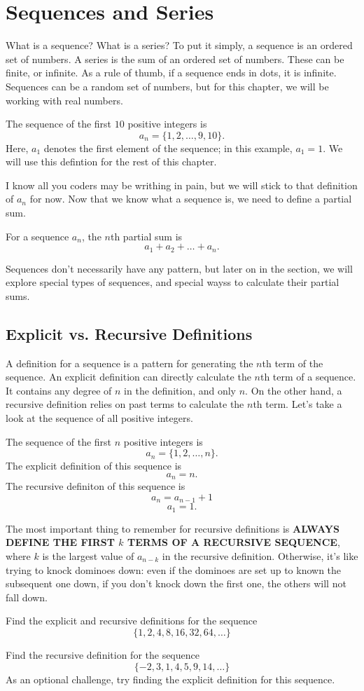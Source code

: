 \chapter{Sequences and Series}
What is a sequence? What is a series? To put it simply, a sequence is an ordered set of numbers. A series is the sum of an ordered set of numbers. These can be finite, or infinite. As a rule of thumb, if a sequence ends in dots, it is infinite. Sequences can be a random set of numbers, but for this chapter, we will be working with real numbers.
\begin{example}
    The sequence of the first $10$ positive integers is
    \[a_n=\{1,2,\dots,9,10\}.\]
    Here, $a_1$ denotes the first element of the sequence; in this example, $a_1=1$. We will use this defintion for the rest of this chapter.
\end{example}
I know all you coders may be writhing in pain, but we will stick to that definition of $a_n$ for now. Now that we know what a sequence is, we need to define a partial sum.
\begin{definition}
    For a sequence $a_n$, the $n$th partial sum is
    \[a_1+a_2+\dots+a_n.\]
\end{definition}
Sequences don't necessarily have any pattern, but later on in the section, we will explore special types of sequences, and special wayss to calculate their partial sums.
\section{Explicit vs. Recursive Definitions}
A definition for a sequence is a pattern for generating the $n$th term of the sequence. An explicit definition can directly calculate the $n$th term of a sequence. It contains any degree of $n$ in the definition, and only $n$. On the other hand, a recursive definition relies on past terms to calculate the $n$th term. Let's take a look at the sequence of all positive integers.
\begin{example}
    The sequence of the first $n$ positive integers is
    \[a_n=\{1,2,\dots,n\}.\]
    The explicit definition of this sequence is
    \[a_n=n.\]
    The recursive definiton of this sequence is
    \[a_n=a_{n-1}+1\]
    \[a_1=1.\]
\end{example}
The most important thing to remember for recursive definitions is \textbf{ALWAYS DEFINE THE FIRST $k$ TERMS OF A RECURSIVE SEQUENCE}, where $k$ is the largest value of $a_{n-k}$ in the recursive definition. Otherwise, it's like trying to knock dominoes down: even if the dominoes are set up to known the subsequent one down, if you don't knock down the first one, the others will not fall down.
\begin{problem}
    Find the explicit and recursive definitions for the sequence 
    \[\{1, 2, 4, 8, 16, 32, 64,\dots\}\]
\end{problem}
\begin{problem}
    Find the recursive definition for the sequence
    \[\{-2, 3, 1, 4, 5, 9, 14,\dots\}\]
    As an optional challenge, try finding the explicit definition for this sequence.
\end{problem}



